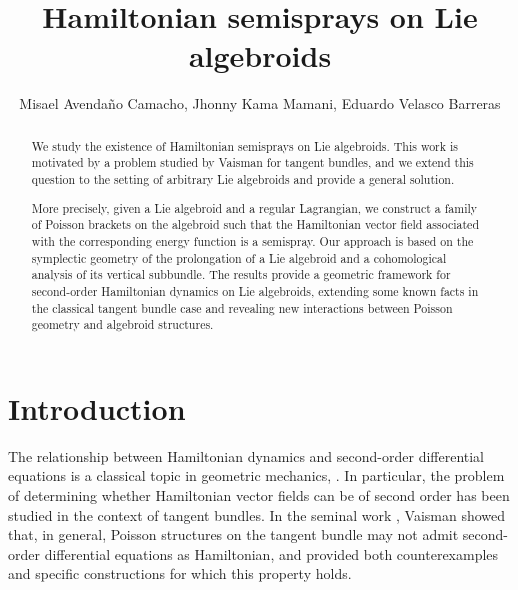 \documentclass[12pt,letterpaper]{article}
\numberwithin{equation}{section}
\begin{document}
\title{Hamiltonian semisprays on Lie algebroids}

\author{Misael Avenda\~{n}o Camacho, Jhonny Kama Mamani, Eduardo Velasco Barreras}

\maketitle

\begin{abstract}
We study the existence of Hamiltonian semisprays on Lie algebroids. This work is motivated by a problem studied by Vaisman for tangent bundles, and we extend this question to the setting of arbitrary Lie algebroids and provide a general solution.

More precisely, given a Lie algebroid and a regular Lagrangian, we construct a
family of Poisson brackets on the algebroid such that the Hamiltonian vector
field associated with the corresponding energy function is a semispray. Our approach
is based on the symplectic geometry of the prolongation of a Lie algebroid and a
cohomological analysis of its vertical subbundle. The results provide a geometric framework for second-order Hamiltonian dynamics
on Lie algebroids, extending  some known facts in the classical tangent bundle case and revealing new
interactions between Poisson geometry and algebroid structures.



\end{abstract}


\section{ Introduction}

The relationship between Hamiltonian dynamics and second-order differential equations is a classical topic in geometric mechanics, \cite{arnold1989mathematical,marsden1994introduction,marsden1984semidirect,szilasi2013connections}. 
In particular, the problem of determining whether Hamiltonian vector fields can be of second order has been studied in the context of tangent bundles. 
In the seminal work \cite{Vais1995}, Vaisman showed that, in general, Poisson structures on the tangent bundle may not admit second-order differential equations as Hamiltonian, and provided both counterexamples and specific constructions for which this property holds.
\end{document}
